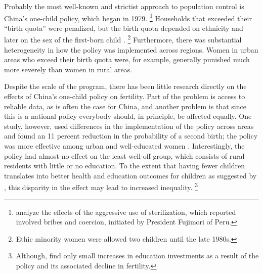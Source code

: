 \documentclass[letterpaper,12pt]{article}
\begin{document}
Probably the most well-known and strictist approach to population
control is China's one-child policy, which began in 1979.%
\footnote{
\citet{Byker2012} analyze the effects of the aggressive use of
sterilization, which reported involved bribes and coercion, initiated by
President Fujimori of Peru.} 
Households that exceeded their ``birth quota'' were penalized, but the
birth quota depended on ethnicity and later on the sex of the first-born
child \citep{Li2005}.%
\footnote{
Ethic minority women were allowed two children until the late 1980s.} 
Furthermore, there was substantial heterogeneity in how the policy was
implemented across regions. 
Women in urban areas who exceed their birth quota were, for example,
generally punished much more severely than women in rural areas.

Despite the scale of the program, there has been little research
directly on the effects of China's one-child policy on fertility. 
Part of the problem is access to reliable data, as is often the case for
China, and another problem is that since this is a national policy
everybody should, in principle, be affected equally. 
One study, however, used differences in the implementation of the policy
across areas and found an 11 percent reduction in the probability of a
second birth; the policy was more effective among urban and
well-educated women \citep{Li2005}. 
Interestingly, the policy had almost no eﬀect on the least well-oﬀ
group, which consists of rural residents with little or no education. 
To the extent that having fewer children translates into better health
and education outcomes for children as suggested by \citet{becker73},
this disparity in the effect may lead to increased inequality.%
\footnote{
Although, \citet{Rosenzweig2009} find only small increases in education
investments as a result of the policy and its associated decline in
fertility.}
\end{document}
